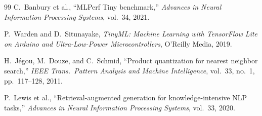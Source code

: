 \documentclass[11pt,letterpaper]{article}
\begin{document}
\begin{thebibliography}{99}
C.~Banbury et al., ``MLPerf Tiny benchmark,'' \textit{Advances in Neural Information Processing Systems}, vol.~34, 2021.

P.~Warden and D.~Situnayake, \textit{TinyML: Machine Learning with TensorFlow Lite on Arduino and Ultra-Low-Power Microcontrollers}, O'Reilly Media, 2019.

H.~J\'{e}gou, M.~Douze, and C.~Schmid, ``Product quantization for nearest neighbor search,'' \textit{IEEE Trans.\ Pattern Analysis and Machine Intelligence}, vol.~33, no.~1, pp.~117--128, 2011.

P.~Lewis et al., ``Retrieval-augmented generation for knowledge-intensive NLP tasks,'' \textit{Advances in Neural Information Processing Systems}, vol.~33, 2020.
\end{thebibliography}
\end{document}
